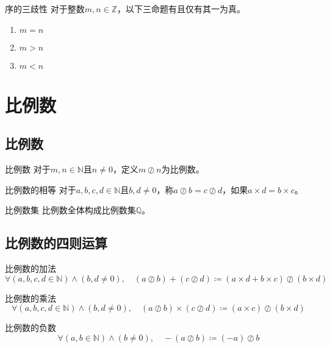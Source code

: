 \documentclass[lang = cn, scheme = chinese, thmcnt = section]{elegantbook}
\newcommand{\N}{\mathbb{N}}            %
\newcommand{\Q}{\mathbb{Q}}            %
\newcommand{\Z}{\mathbb{Z}}            %
\begin{document}
\begin{theorem}{序的三歧性}
	对于整数$m,n\in\Z$，以下三命题有且仅有其一为真。
	\begin{enumerate}
		\item $m=n$
		\item $m>n$
		\item $m<n$
	\end{enumerate}
\end{theorem}

\section{比例数}

\subsection{比例数}

\begin{definition}{比例数}
	对于$m,n\in\N$且$n\ne 0$，定义$m\oslash n$为比例数。
\end{definition}

\begin{definition}{比例数的相等}
	对于$a,b,c,d\in\N$且$b,d\ne 0$，称$a\oslash  b=c\oslash  d$，如果$a\times d=b\times c$。
\end{definition}

\begin{definition}{比例数集}
	比例数全体构成比例数集$\Q$。
\end{definition}

\subsection{比例数的四则运算}

\begin{definition}{比例数的加法}
	$$
	\forall (a,b,c,d\in\N)\wedge (b,d\ne 0),\quad (a \oslash b)+(c \oslash d)\coloneqq (a\times d+b\times c)\oslash(b\times d)
	$$
\end{definition}

\begin{definition}{比例数的乘法}
	$$
	\forall (a,b,c,d\in\N)\wedge (b,d\ne 0),\quad 
	(a \oslash b)\times(c \oslash d)\coloneqq (a\times c)\oslash(b\times d)
	$$
\end{definition}

\begin{definition}{比例数的负数}
	$$
	\forall (a,b\in\N)\wedge (b\ne 0),\quad 
	-(a\oslash b)\coloneqq (-a)\oslash b
	$$
\end{definition}
\end{document}
